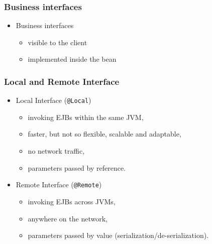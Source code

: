 \documentclass[10pt,xcolor=pdflatex]{beamer}
\begin{document}
\begin{frame}\frametitle{Business interfaces}
	\begin{itemize}
      \item Business interfaces
        \begin{itemize}
          \item visible to the client
          \item implemented inside the bean
        \end{itemize}
	\end{itemize}
\end{frame}


\begin{frame}\frametitle{Local and Remote Interface}
	\begin{itemize}
		\item Local Interface (\texttt{@Local})
          \begin{itemize}
            \item invoking EJBs within the same JVM,
            \item faster, but not so flexible, scalable and adaptable,
            \item no network traffic,
            \item parameters passed by reference.
          \end{itemize}
		\item Remote Interface (\texttt{@Remote})
          \begin{itemize}
        	\item invoking EJBs across JVMs,
        	\item anywhere on the network,
        	\item parameters passed by value (serialization/de-serialization).
          \end{itemize}
	\end{itemize}
\end{frame}
\end{document}

